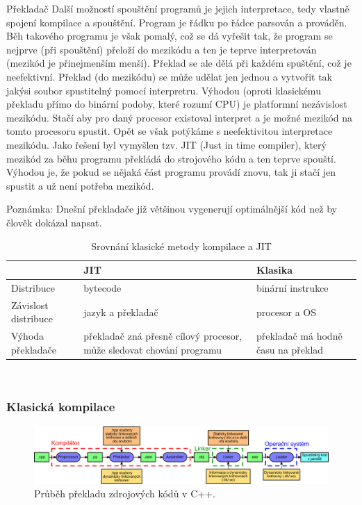 \begin{definiceN}{Překladač}
Další možností spouštění programů je jejich interpretace, tedy vlastně spojení kompilace a spouštění. Program je řádku po řádce parsován a prováděn. Běh takového programu je však pomalý, což se dá vyřešit tak, že program se nejprve (při spouštění) přeloží do mezikódu a ten je teprve interpretován (mezikód je přinejmenším menší). Překlad se ale dělá při každém spuštění, což je neefektivní. Překlad (do mezikódu) se může udělat jen jednou a vytvořit tak jakýsi soubor spustitelný pomocí interpretru. Výhodou (oproti klasickému překladu přímo do binární podoby, které rozumí CPU) je platformní nezávislost mezikódu. Stačí aby pro daný procesor existoval interpret a je možné mezikód na tomto procesoru spustit. Opět se však potýkáme s neefektivitou interpretace mezikódu. Jako řešení byl vymyšlen tzv. JIT (Just in time compiler), který mezikód za běhu programu překládá do strojového kódu a ten teprve spouští. Výhodou je, že pokud se nějaká část programu provádí znovu, tak ji stačí jen spustit a už není potřeba mezikód.

Poznámka: Dnešní překladače již většinou vygenerují optimálnější kód než by člověk dokázal napsat.

\begin{table}[h]
	{\centering
	\begin{tabular}{ l || p{4cm} | p{4cm} }
		& JIT & Klasika \\
		\hline
		\hline
		Distribuce & bytecode & binární instrukce \\
		\hline
		Závislost distribuce & jazyk a překladač & procesor a OS \\
		\hline
		Výhoda překladače & překladač zná přesně cílový procesor, může sledovat chování programu & překladač má hodně času na překlad
	\end{tabular} \\
	}
	\caption{Srovnání klasické metody kompilace a JIT}
	\label{tab:Srovnani_JIT}
\end{table}


\subsubsection{Klasická kompilace}
\begin{figure}[h]
	\centering
	\includegraphics[width=15cm]{i2/softwarove_inzenyrstvi/obrazky/Preklad.pdf}
	\caption{Průběh překladu zdrojových kódů v C++.}
	\label{pic:Preklad}
\end{figure}


\end{definiceN}
